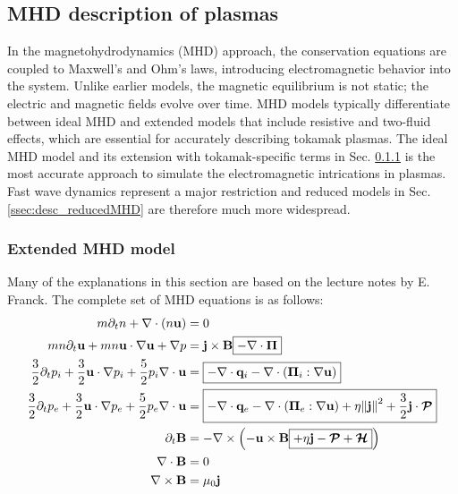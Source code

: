 \subsection{MHD description of plasmas}
\label{sec:desc_MHD}
In the magnetohydrodynamics (MHD) approach, the conservation equations are coupled to Maxwell's and Ohm's laws, introducing electromagnetic behavior into the system. Unlike earlier models, the magnetic equilibrium is not static; the electric and magnetic fields evolve over time. MHD models typically differentiate between ideal MHD and extended models that include resistive and two-fluid effects, which are essential for accurately describing tokamak plasmas. The ideal MHD model and its extension with tokamak-specific terms in Sec. \ref{ssec:desc_extendedMHD} is the most accurate approach to simulate the electromagnetic intrications in plasmas. Fast wave dynamics represent a major restriction and reduced models in Sec. \ref{ssec:desc_reducedMHD} are therefore much more widespread. 

\subsubsection{Extended MHD model}
\label{ssec:desc_extendedMHD}
Many of the explanations in this section are based on the lecture notes by E. Franck\cite{lessig2016fluid}. The complete set of MHD equations is as follows:
\begin{align}
	m\partial_t n + \nabla \cdot (n \mathbf{u}) &= 0 \label{eq:desc_MHDmass} \\
	mn\partial_t\mathbf{u} + mn\mathbf{u}\cdot\nabla\mathbf{u} + \nabla p &= \mathbf{j} \times \mathbf{B} \boxed{- \nabla \cdot \boldsymbol{\Pi}} \label{eq:desc_MHDmomentum} \\
	\frac{3}{2}\partial_t p_i + \frac{3}{2} \mathbf{u} \cdot \nabla p_i + \frac{5}{2}p_i \nabla \cdot \mathbf{u} &= \boxed{- \nabla \cdot \mathbf{q}_i - \nabla \cdot (\boldsymbol{\Pi}_i : \nabla \mathbf{u})} \label{eq:desc_MHDionpressure} \\
	\frac{3}{2}\partial_t p_e + \frac{3}{2} \mathbf{u} \cdot \nabla p_e + \frac{5}{2}p_e \nabla \cdot \mathbf{u}  &= \boxed{- \nabla \cdot \mathbf{q}_e - \nabla \cdot (\boldsymbol{\Pi}_e : \nabla \mathbf{u}) + \eta \norm{\mathbf{j}}^2 + \frac{3}{2}\mathbf{j}\cdot \bm{\mathcal{P}}} \label{eq:desc_MHDelectronpressure} \\
	\partial_t \mathbf{B} &= -\nabla \times \left(-\mathbf{u} \times \mathbf{B} \boxed{+ \eta \mathbf{j} - \bm{\mathcal{P}} + \bm{\mathcal{H}}}\right) \label{eq:desc_MHDohmlaw} \\
	\nabla \cdot \mathbf{B} &= 0 \label{eq:desc_MHDgausslaw} \\
	\nabla \times \mathbf{B} &= \mu_0 \mathbf{j} \label{eq:desc_MHDamperelaw}
\end{align}

